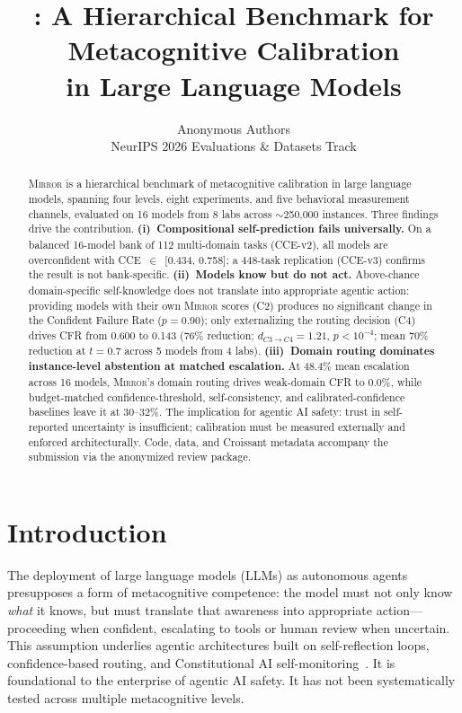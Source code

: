 \documentclass[10pt]{article}
\title{\mirror{}: A Hierarchical Benchmark for Metacognitive Calibration\\in Large Language Models}
\author{
  Anonymous Authors \\
  NeurIPS 2026 Evaluations \& Datasets Track
}
\date{}
\newcommand{\mirror}{\textsc{Mirror}}
\newcommand{\CCE}{CCE}
\newcommand{\CFR}{CFR}
\begin{document}
\maketitle

\begin{abstract}
\mirror{} is a hierarchical benchmark of metacognitive calibration in large language models, spanning four levels, eight experiments, and five behavioral measurement channels, evaluated on 16 models from 8 labs across $\sim$250{,}000 instances. Three findings drive the contribution.
\textbf{(i)~Compositional self-prediction fails universally.} On a balanced 16-model bank of 112 multi-domain tasks (\CCE{}-v2), all models are overconfident with \CCE{}~$\in$~[0.434, 0.758]; a 448-task replication (\CCE{}-v3) confirms the result is not bank-specific.
\textbf{(ii)~Models know but do not act.} Above-chance domain-specific self-knowledge does not translate into appropriate agentic action: providing models with their own \mirror{} scores (C2) produces no significant change in the Confident Failure Rate ($p\!=\!0.90$); only externalizing the routing decision (C4) drives \CFR{} from 0.600 to 0.143 (76\% reduction; $d_{C3\to C4}\!=\!1.21$, $p\!<\!10^{-4}$; mean 70\% reduction at $t\!=\!0.7$ across 5 models from 4 labs).
\textbf{(iii)~Domain routing dominates instance-level abstention at matched escalation.} At 48.4\% mean escalation across 16 models, \mirror{}'s domain routing drives weak-domain \CFR{} to 0.0\%, while budget-matched confidence-threshold, self-consistency, and calibrated-confidence baselines leave it at 30--32\%.
The implication for agentic AI safety: trust in self-reported uncertainty is insufficient; calibration must be measured externally and enforced architecturally. Code, data, and Croissant metadata accompany the submission via the anonymized review package.
\end{abstract}

\section{Introduction}
\label{sec:intro}

The deployment of large language models (LLMs) as autonomous agents presupposes a
form of metacognitive competence: the model must not only know \textit{what} it
knows, but must translate that awareness into appropriate action---proceeding when
confident, escalating to tools or human review when uncertain. This assumption
underlies agentic architectures built on self-reflection loops, confidence-based
routing, and Constitutional AI self-monitoring~\citep{perez2022sycophancy}. It is
foundational to the enterprise of agentic AI safety. It has not been
systematically tested across multiple metacognitive levels.
\end{document}
